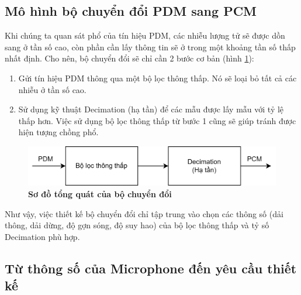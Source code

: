 \subsection{Mô hình bộ chuyển đổi PDM sang PCM} \label{mohinhpdm2pcm}
Khi chúng ta quan sát phổ của tín hiệu PDM, các nhiễu lượng tử sẽ được dồn sang ở tần số cao, còn phần cần lấy thông tin sẽ ở trong một khoảng tần số thấp nhất định. Cho nên, bộ chuyển đổi sẽ chỉ cần 2 bước cơ bản (hình \ref{pdm2pcm_top}):
\begin{enumerate}
    \item Gửi tín hiệu PDM thông qua một bộ lọc thông thấp. Nó sẽ loại bỏ tất cả các nhiễu ở tần số cao.
    \item Sử dụng kỹ thuật Decimation (hạ tần) để các mẫu được lấy mẫu với tỷ lệ thấp hơn. Việc sử dụng bộ lọc thông thấp từ bước 1 cũng sẽ giúp tránh được hiện tượng chồng phổ.
\end{enumerate}

\begin{figure}[H]
    \centering
    \includegraphics[width=12cm]{Images/Chuong3/pdm2pcm_top.png}
    \caption[Sơ đồ tổng quát của bộ chuyển đổi]{\bfseries \fontsize{12pt}{0pt}\selectfont Sơ đồ tổng quát của bộ chuyển đổi}
    \label{pdm2pcm_top}
\end{figure}

Như vậy, việc thiết kế bộ chuyển đổi chỉ tập trung vào chọn các thông số (dải thông, dải dừng, độ gợn sóng, độ suy hao) của bộ lọc thông thấp và tỷ số Decimation phù hợp.


\subsection{Từ thông số của Microphone đến yêu cầu thiết kế} \label{spec_muc}

